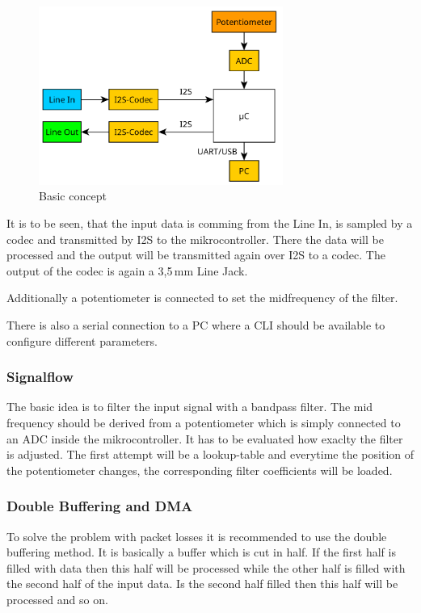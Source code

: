 \begin{figure}[!h]
    \centering
    \includegraphics[width=8cm]{img/basic_concept.PNG}
    \caption{Basic concept}
    \label{fig:basic-concept}
\end{figure}

It is to be seen, that the input data is comming from the Line In, is sampled by a codec and transmitted
by \ac{I2S} to the mikrocontroller. There the data will be processed and the output will be transmitted
again over \ac{I2S} to a codec. The output of the codec is again a 3,5\,mm Line Jack.

Additionally a potentiometer is connected to set the midfrequency of the filter.

There is also a serial connection to a PC where a \ac{CLI} should be available to configure
different parameters.

\subsubsection{Signalflow}

The basic idea is to filter the input signal with a bandpass filter. The mid frequency should be derived
from a potentiometer which is simply connected to an \ac{ADC} inside the mikrocontroller. It has to be evaluated
how exaclty the filter is adjusted. The first attempt will be a lookup-table and everytime the position of the
potentiometer changes, the corresponding filter coefficients will be loaded.

\subsubsection{Double Buffering and DMA}

To solve the problem with packet losses it is recommended to use the double buffering method.
It is basically a buffer which is cut in half. If the first half is filled with data then this half
will be processed while the other half is filled with the second half of the input data. Is the second
half filled then this half will be processed and so on.

